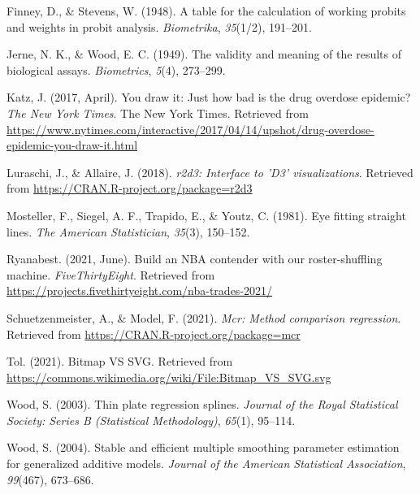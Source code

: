 \documentclass[print]{nuthesis}
\newlength{\cslhangindent}
\newenvironment{CSLReferences}[2]%
{\setlength{\parindent}{0pt}%
\everypar{\setlength{\hangindent}{\cslhangindent}}\ignorespaces}%
{\par}
\begin{document}
\begin{CSLReferences}{1}{0}
\leavevmode{}%
Finney, D., \& Stevens, W. (1948). A table for the calculation of working probits and weights in probit analysis. \emph{Biometrika}, \emph{35}(1/2), 191--201.

\leavevmode{}%
Jerne, N. K., \& Wood, E. C. (1949). The validity and meaning of the results of biological assays. \emph{Biometrics}, \emph{5}(4), 273--299.

\leavevmode{}%
Katz, J. (2017, April). You draw it: Just how bad is the drug overdose epidemic? \emph{The New York Times}. The New York Times. Retrieved from \url{https://www.nytimes.com/interactive/2017/04/14/upshot/drug-overdose-epidemic-you-draw-it.html}

\leavevmode{}%
Luraschi, J., \& Allaire, J. (2018). \emph{r2d3: Interface to 'D3' visualizations}. Retrieved from \url{https://CRAN.R-project.org/package=r2d3}

\leavevmode{}%
Mosteller, F., Siegel, A. F., Trapido, E., \& Youtz, C. (1981). Eye fitting straight lines. \emph{The American Statistician}, \emph{35}(3), 150--152.

\leavevmode{}%
Ryanabest. (2021, June). Build an NBA contender with our roster-shuffling machine. \emph{FiveThirtyEight}. Retrieved from \url{https://projects.fivethirtyeight.com/nba-trades-2021/}

\leavevmode{}%
Schuetzenmeister, A., \& Model, F. (2021). \emph{Mcr: Method comparison regression}. Retrieved from \url{https://CRAN.R-project.org/package=mcr}

\leavevmode{}%
Tol. (2021). Bitmap VS SVG. Retrieved from \url{https://commons.wikimedia.org/wiki/File:Bitmap_VS_SVG.svg}

\leavevmode{}%
Wood, S. (2003). Thin plate regression splines. \emph{Journal of the Royal Statistical Society: Series B (Statistical Methodology)}, \emph{65}(1), 95--114.

\leavevmode{}%
Wood, S. (2004). Stable and efficient multiple smoothing parameter estimation for generalized additive models. \emph{Journal of the American Statistical Association}, \emph{99}(467), 673--686.


\end{CSLReferences}
\end{document}

